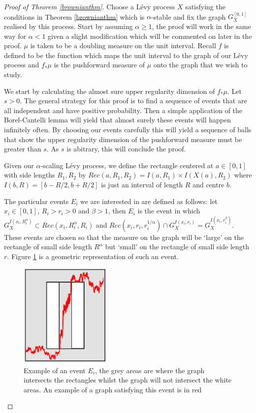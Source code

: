 \begin{proof}[Proof of Theorem \ref{brownianthm}]



Choose a L\'evy process $X$ satisfying the conditions in Theorem \ref{brownianthm} which is $\alpha$-stable and fix the graph $G_X^{[0,1]}$ realised by this process. Start by assuming $\alpha \ge 1$, the proof will work in the same way for $\alpha < 1$ given a slight modification which will be commented on later in the proof. $\mu$ is taken to be a doubling measure on the unit interval. Recall $f$ is defined to be the function which maps the unit interval to the graph of our L\'evy process and $f_*\mu$ is the pushforward measure of $\mu$ onto the graph that we wish to study.

We start by calculating the almost sure upper regularity dimension of $f_*\mu$. Let $s>0$. The general strategy for this proof is to find a sequence of events that are all independent and have positive probability. Then a simple application of the Borel-Cantelli lemma will yield that almost surely these events will happen infinitely often. By choosing our events carefully this will yield a sequence of balls that show the upper regularity dimension of the pushforward measure must be greater than $s$. As $s$ is abitrary, this will conclude the proof.

Given our $\alpha$-scaling L\'evy process, we define the rectangle centered at $a\in [0,1]$ with side lengths $R_1,R_2$ by $Rec(a,R_1,R_2) = I(a,R_1) \times I(X(a),R_2)$ where $I(b,R) = [b-R/2,b+R/2]$ is just an interval of length $R$ and centre $b$. 

The particular events $E_i$ we are interested in are defined as follows: let $x_i \in [0,1]$, $R_i > r_i> 0$ and $\beta > 1$, then $E_i$ is the event in which $G_X^{I(x_i,R_i^{\alpha})} \subset Rec(x_i,R_i^{\alpha},R_i)$ and $Rec(x_i, r_i, r_i^{1/\alpha}) \cap G_X^{I(x_i,r_i)} = G_X^{I(x_i,r_i^{\beta})}$. These events are chosen so that the measure on the graph will be `large' on the rectangle of small side length $R^{\alpha}$ but `small' on the rectangle of small side length $r$. Figure \ref{brownian_event} is a geometric representation of such an event.  

\begin{figure}[htbp]
	\centering
	\includegraphics[width=0.4\textwidth]{pics/ch-brownian/new_rectangles.png}
	\caption{Example of an event $E_i$, the grey areas are where the graph intersects the rectangles whilst the graph will not intersect the white areas. An example of a graph satisfying this event is in red}
	\label{brownian_event}
\end{figure}


\end{proof}
